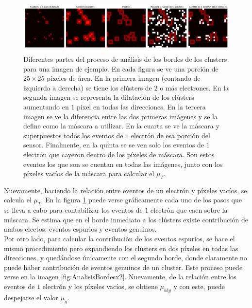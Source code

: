\begin{figure}[h]
    \centering
    \includegraphics[scale=0.4]{Figs/analisis_bordes.pdf}
    \caption{\footnotesize{Diferentes partes del proceso de análisis de los bordes de los clusters para una imagen de ejemplo. En cada figura se ve una porción de $25 \times 25$ píxeles de área. En la primera imagen (contando de izquierda a derecha) se tiene los clústers de $2$ o más electrones. En la segunda imagen se representa la dilatación de los clústers aumentando en $1$ píxel en todas las direcciones. En la tercera imagen se ve la diferencia entre las dos primeras imágenes y se la define como la máscara a utilizar. En la cuarta se ve la máscara y superpuestos todos los eventos de $1$ electrón de esa porción del sensor. Finalmente, en la quinta se se ven solo los eventos de $1$ electrón que cayeron dentro de los píxeles de máscara. Son estos eventos los que son se cuentan en todas las imágenes, junto con los píxeles vacíos de la máscara para calcular el $\mu_{T}$.}}
    \label{fig:AnalisisBordes}
\end{figure}
Nuevamente, haciendo la relación entre eventos de un electrón y píxeles vacíos, se calcula el $\mu_{T}$. En la figura \ref{fig:AnalisisBordes} puede verse gráficamente cada uno de los pasos que se lleva a cabo para contabilizar los eventos de $1$ electrón que caen sobre la máscara. Se estima que en el borde inmediato a los clústers existe contribución de ambos efectos: eventos espurios y eventos genuinos.\\
\indent Por otro lado, para calcular la contribución de los eventos espurios, se hace el mismo procedimiento pero expandiendo los clústers en dos píxeles en todas las direcciones, y quedándose únicamente con el segundo borde, donde claramente no puede haber contribución de eventos genuinos de un cluster. Este proceso puede verse en la imagen \ref{fig:AnalisisBordesx2}. Nuevamente, de la relación entre los eventos de $1$ electrón y los píxeles vacíos, se obtiene $\mu_{bkg}$ y con este, puede despejarse el valor $\mu_{g}$.\\

